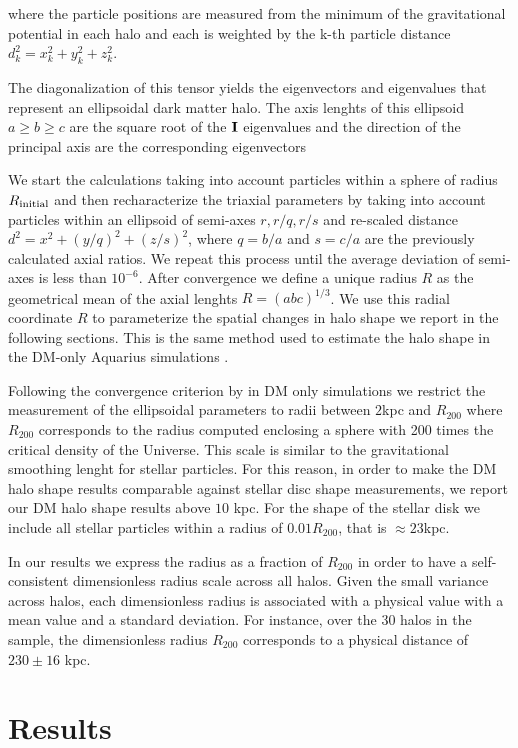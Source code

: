 \documentclass[usenatbib]{mnras}
\begin{document}
where the particle positions are measured from the minimum of the
gravitational potential in each halo and each is weighted by the k-th
particle distance $d_k^2=x_k^2+y_k^2+z_k^2$.

The diagonalization of this tensor yields the eigenvectors and
eigenvalues that represent an ellipsoidal dark matter halo.
The axis lenghts of this ellipsoid $a\geq b \geq c$ are the square
root of the ${\bf I}$ eigenvalues and the direction of the principal
axis are the corresponding eigenvectors 

We start the calculations taking into account particles within a
sphere of radius $R_{\rm initial}$ and then recharacterize the
triaxial parameters 
by taking into account particles within an ellipsoid of semi-axes
$r,r/q,r/s$ and re-scaled distance $d^2=x^2+(y/q)^2+(z/s)^2$, where $q
= b/a$ and $s=c/a$ are the previously calculated axial ratios. 
We repeat this process until the average deviation of semi-axes is
less than $10^{-6}$.  
After convergence we define a unique radius $R$ as the geometrical
mean of the axial lenghts $R=(abc)^{1/3}$.
We use this radial coordinate $R$ to parameterize the spatial changes
in halo shape we report in the following sections.
This is the same method used to estimate the halo shape in the DM-only
Aquarius simulations \citep{VeraCiro11}. 

Following the convergence criterion by \cite{VeraCiro11} in DM only simulations
we restrict the measurement of the ellipsoidal parameters to radii
between $2$kpc and $R_{200}$ where  $R_{200}$ corresponds to the radius
computed enclosing a sphere with 200 times the critical density of the
Universe. 
This scale is similar to the gravitational smoothing lenght for
stellar particles. 
For this reason, in order to make the DM halo shape results comparable
against stellar disc shape measurements, we report our DM halo shape
results above $10$ kpc.
For the shape of the stellar disk we include all stellar particles
within a radius of $0.01R_{200}$, that is $\approx 23$kpc. 

In our results we express the radius as a fraction of $R_{200}$ in
order to have a self-consistent dimensionless radius scale across all
halos. 
Given the small variance across halos, each dimensionless radius is associated with
a physical value with a mean value and a standard deviation.
For instance, over the 30 halos in the sample, the dimensionless
radius $R_{200}$ corresponds to a physical distance of $230\pm 16$
kpc.  


\section{Results}
\label{sec:results}
\end{document}

